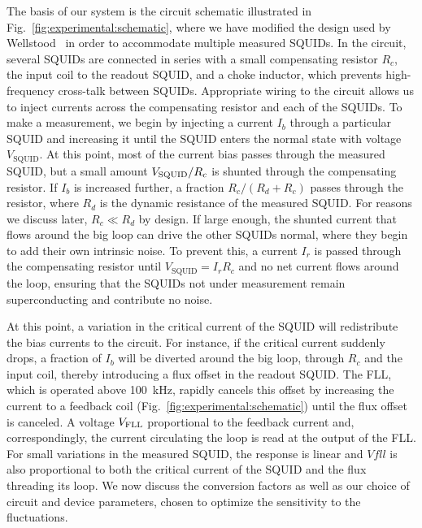 The basis of our system is the circuit schematic illustrated in Fig.~\ref{fig:experimental:schematic}, where we have modified the design used by Wellstood~\citep{Wellstood:thesis} in order to accommodate multiple measured SQUIDs. In the circuit, several SQUIDs are connected in series with a small compensating resistor $R_c$, the input coil to the readout SQUID, and a choke inductor, which prevents high-frequency cross-talk between SQUIDs. Appropriate wiring to the circuit allows us to inject currents across the compensating resistor and each of the SQUIDs. To make a measurement, we begin by injecting a current $I_b$ through a particular SQUID and increasing it until the SQUID enters the normal state with voltage $V_{\text{SQUID}}$. At this point, most of the current bias passes through the measured SQUID, but a small amount $V_\text{SQUID}/R_c$ is shunted through the compensating resistor. If $I_b$ is increased further, a fraction $R_c/(R_d+R_c)$ passes through the resistor, where $R_d$ is the dynamic resistance of the measured SQUID. For reasons we discuss later, $R_c \ll R_d$ by design. If large enough, the shunted current that flows around the big loop can drive the other SQUIDs normal, where they begin to add their own intrinsic noise. To prevent this, a current $I_r$ is passed through the compensating resistor until $V_{\text{SQUID}} = I_r R_c$ and no net current flows around the loop, ensuring that the SQUIDs not under measurement remain superconducting and contribute no noise.

At this point, a variation in the critical current of the SQUID will redistribute the bias currents to the circuit. For instance, if the critical current suddenly drops, a fraction of $I_b$ will be diverted around the big loop, through $R_c$ and the input coil, thereby introducing a flux offset in the readout SQUID. The FLL, which is operated above 100~kHz, rapidly cancels this offset by increasing the current to a feedback coil (Fig.~\ref{fig:experimental:schematic}) until the flux offset is canceled. A voltage $V_\text{FLL}$ proportional to the feedback current and, correspondingly, the current circulating the loop is read at the output of the FLL. For small variations in the measured SQUID, the response is linear and $Vfll$ is also proportional to both the critical current of the SQUID and the flux threading its loop. We now discuss the conversion factors as well as our choice of circuit and device parameters, chosen to optimize the sensitivity to the fluctuations.

